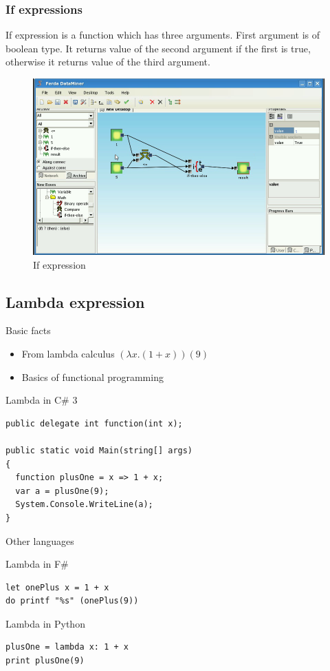 \documentclass[a4paper,12pt]{book}
\begin{document}
\subsubsection{If expressions}
If expression is a function which has three arguments. First argument is of boolean type. It returns value of the second argument if the first is true, otherwise it returns value of the third argument.
\begin{figure}
\includegraphics[width=13.72cm]{ifthenelse2.png}
	\caption{If expression}
\end{figure}

\subsection{Lambda expression}
Basic facts
\begin{itemize}
	\item From lambda calculus $(\lambda x.(1+x))(9)$
	\item Basics of functional programming
\end{itemize}

Lambda in C\# 3
\begin{verbatim}
public delegate int function(int x);

public static void Main(string[] args)
{
  function plusOne = x => 1 + x;
  var a = plusOne(9);
  System.Console.WriteLine(a);
}
\end{verbatim}
	
Other languages

Lambda in F\#
\begin{verbatim}
let onePlus x = 1 + x
do printf "%s" (onePlus(9)) 
\end{verbatim}

Lambda in Python
\begin{verbatim}
plusOne = lambda x: 1 + x
print plusOne(9)
\end{verbatim}
\end{document}
